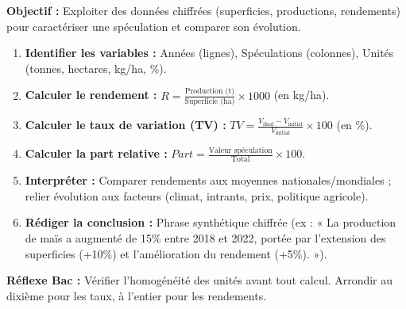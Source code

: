 \documentclass[11pt]{article}
\begin{document}
\begin{methode}
\textbf{Objectif :} Exploiter des données chiffrées (superficies, productions, rendements) pour caractériser une spéculation et comparer son évolution.
\begin{enumerate}
    \item \textbf{Identifier les variables :} Années (lignes), Spéculations (colonnes), Unités (tonnes, hectares, kg/ha, \%).
    \item \textbf{Calculer le rendement :} $R = \frac{\text{Production (t)}}{\text{Superficie (ha)}} \times 1000$ (en kg/ha).
    \item \textbf{Calculer le taux de variation (TV) :} $TV = \frac{V_{\text{final}} - V_{\text{initial}}}{V_{\text{initial}}} \times 100$ (en \%).
    \item \textbf{Calculer la part relative :} $Part = \frac{\text{Valeur spéculation}}{\text{Total}} \times 100$.
    \item \textbf{Interpréter :} Comparer rendements aux moyennes nationales/mondiales ; relier évolution aux facteurs (climat, intrants, prix, politique agricole).
    \item \textbf{Rédiger la conclusion :} Phrase synthétique chiffrée (ex : « La production de maïs a augmenté de 15\% entre 2018 et 2022, portée par l'extension des superficies (+10\%) et l'amélioration du rendement (+5\%). »).
\end{enumerate}
\textbf{Réflexe Bac :} Vérifier l'homogénéité des unités avant tout calcul. Arrondir au dixième pour les taux, à l'entier pour les rendements.
\end{methode}
\end{document}
